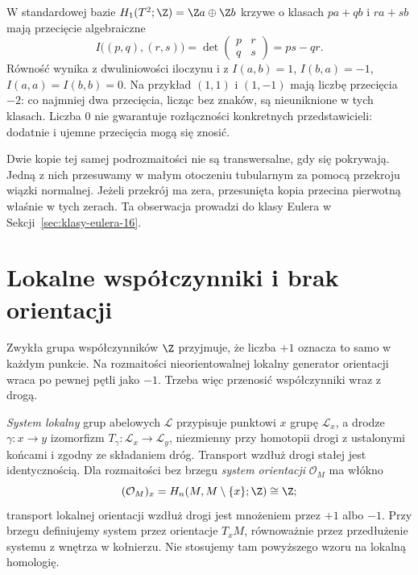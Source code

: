 \begin{przyklad}
W standardowej bazie
$H_1(T^2;\Z)=\Z a\oplus\Z b$
krzywe o klasach
$pa+qb$ i $ra+sb$
mają przecięcie algebraiczne
\[
 I\bigl((p,q),(r,s)\bigr)
 =\det\begin{pmatrix}p&r\\q&s\end{pmatrix}
 =ps-qr.
\]
Równość wynika z dwuliniowości
iloczynu i z
$I(a,b)=1$, $I(b,a)=-1$,
$I(a,a)=I(b,b)=0$.
Na przykład $(1,1)$ i $(1,-1)$
mają liczbę przecięcia $-2$:
co najmniej dwa przecięcia,
licząc bez znaków, są
nieuniknione w tych klasach.
Liczba $0$ nie gwarantuje
rozłączności konkretnych
przedstawicieli: dodatnie
i ujemne przecięcia mogą
się znosić.
\end{przyklad}

\begin{uwaga}[Samoprzecięcie]
Dwie kopie tej samej
podrozmaitości nie są
transwersalne, gdy się
pokrywają. Jedną z nich
przesuwamy w małym
otoczeniu tubularnym
za pomocą przekroju
wiązki normalnej.
Jeżeli przekrój ma zera,
przesunięta kopia
przecina pierwotną
właśnie w tych zerach.
Ta obserwacja prowadzi
do klasy Eulera
w Sekcji~\ref{sec:klasy-eulera-16}.
\end{uwaga}

\section{Lokalne współczynniki i brak orientacji}
\label{sec:lokalne-wsp-16}

Zwykła grupa współczynników
$\Z$ przyjmuje, że liczba
$+1$ oznacza to samo w
każdym punkcie. Na rozmaitości
nieorientowalnej lokalny
generator orientacji wraca
po pewnej pętli jako $-1$.
Trzeba więc przenosić
współczynniki wraz z drogą.

\begin{definicja}
\label{def:system-lokalny-16}
\emph{System lokalny} grup abelowych
$\mathcal L$ przypisuje punktowi
$x$ grupę $\mathcal L_x$,
a drodze $\gamma:x\to y$
izomorfizm
$T_\gamma:\mathcal L_x\to\mathcal L_y$,
niezmienny przy homotopii
drogi z ustalonymi końcami
i zgodny ze składaniem dróg.
Transport wzdłuż drogi stałej jest identycznością.
Dla rozmaitości bez brzegu \emph{system orientacji}
$\mathcal O_M$ ma włókno
\[
 (\mathcal O_M)_x
  =H_n(M,M\setminus\{x\};\Z)
  \cong\Z;
\]
transport lokalnej orientacji
wzdłuż drogi jest mnożeniem
przez $+1$ albo $-1$. Przy brzegu definiujemy
system przez orientacje $T_xM$, równoważnie przez
przedłużenie systemu z wnętrza w kołnierzu.
Nie stosujemy tam powyższego wzoru na lokalną homologię.
\end{definicja}

